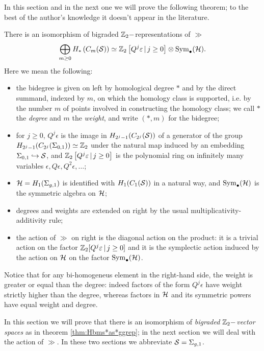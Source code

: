 In this section and in the next one we will prove the following theorem; to the best of the author's knowledge
it doesn't appear in the literature.
\begin{thm}
 \label{thm:Hbms*as*ggrep}
 There is an isomorphism of bigraded $\Z_2-$representations of $\gg$
 \[
  \bigoplus_{m\geq 0} H_*\pa{C_m(\S)}\simeq \Z_2\left[Q^j\epsilon\,|\, j\geq 0\right]\otimes\Sym_{\bullet}(\H).
 \]
 Here we mean the following:
 \begin{itemize}
  \item the bidegree is given on left by homological degree $*$ and by the direct summand,
  indexed by $m$,
  on which the homology class is supported, i.e. by the number $m$ of points
  involved in constructing the homology class; we call $*$ the \emph{degree} and $m$ the \emph{weight},
  and write $(*,m)$ for the bidegree;
  \item for $j\geq 0$, $Q^j\epsilon$ is the image in $H_{2^j-1}(C_{2^j}(\S))$ of a generator
  of the group $H_{2^j-1}(C_{2^j}(\Sigma_{0,1}))\simeq \Z_2$ 
  under the natural map induced by an embedding $\Sigma_{0,1}\hookrightarrow\S$,
  and $\Z_2\left[Q^j\epsilon\,|\, j\geq 0\right]$ is the polynomial ring on
  infinitely many variables $\epsilon,Q\epsilon,Q^2\epsilon,\dots$;
  \item $\H=H_1(\sg)$ is identified with $H_1(C_1(\S))$ in a natural way, and $\Sym_{\bullet}(\H)$ is the
  symmetric algebra on $\H$;
  \item degrees and weights are extended on right by the usual multiplicativity-additivity rule;
  \item the action of $\gg$ on right is the diagonal action on the product: it is a trivial action
  on the factor $\Z_2[Q^j\epsilon\,|\, j\geq 0]$ and it is the symplectic action induced by the action on $\H$ on the
  factor $\Sym_{\bullet}(\H)$.
  \end{itemize}
  
  Notice that for any bi-homogeneus element in the right-hand side, the weight is greater or equal than
  the degree: indeed factors of the form $Q^j\epsilon$ have weight strictly higher than the degree,
  whereas factors in $\H$ and its symmetric powers have equal weight and degree.
\end{thm}
In this section we will prove that there is an isomorphism of \emph{bigraded $\Z_2-$vector spaces}
as in theorem \ref{thm:Hbms*as*ggrep}; in the next section we will deal with the action of
$\gg$. In these two sections we abbreviate $\S=\sg$.

